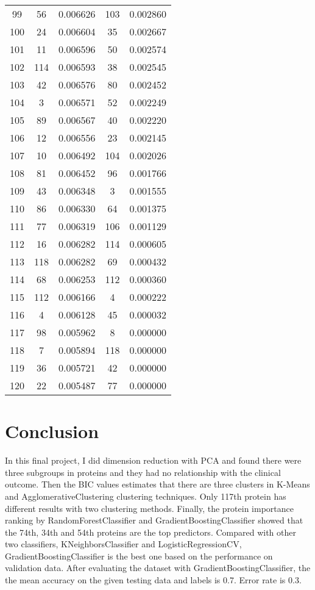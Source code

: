 \documentclass{article}
\begin{document}
\begin{center}
\begin{longtable}{|c|c|c|c|r|}
99 & 56  &0.006626 & 103  & 0.002860 \\ 
100 & 24  &0.006604 & 35  & 0.002667 \\ 
101 & 11  &0.006596 & 50  & 0.002574 \\ 
102 & 114  &0.006593 & 38  & 0.002545 \\ 
103 & 42  &0.006576 & 80  & 0.002452 \\ 
104 & 3  &0.006571 & 52  & 0.002249 \\ 
105 & 89  &0.006567 & 40  & 0.002220 \\
106 & 12  &0.006556 & 23  & 0.002145 \\ 
107 & 10  &0.006492 & 104  & 0.002026 \\ 
108 & 81  &0.006452 & 96  & 0.001766 \\
109 & 43  &0.006348 & 3  & 0.001555 \\ 
110 & 86  &0.006330 & 64  & 0.001375 \\ 
111 & 77  &0.006319 & 106  & 0.001129 \\ 
112 & 16  &0.006282 & 114  & 0.000605 \\
113 & 118  &0.006282 & 69  & 0.000432 \\ 
114 & 68  &0.006253 & 112  & 0.000360 \\
115 & 112  &0.006166 & 4  & 0.000222 \\
116 & 4  &0.006128 & 45  & 0.000032 \\ 
117 & 98  &0.005962 & 8  & 0.000000 \\ 
118 & 7  &0.005894 & 118  & 0.000000 \\
119 & 36  &0.005721 & 42  & 0.000000 \\ 
120 & 22  &0.005487  & 77  & 0.000000 \\ 
\end{longtable}
\end{center}

\section{Conclusion}
In this final project, I did dimension reduction with PCA and found there were three subgroups in proteins and they had no relationship with the clinical outcome. Then the BIC values estimates that there are three clusters in K-Means and AgglomerativeClustering clustering techniques. Only 117th protein has different results with two clustering methods. Finally, the protein importance ranking by RandomForestClassifier and GradientBoostingClassifier showed that the 74th, 34th and 54th proteins are the top predictors. Compared with other two classifiers, KNeighborsClassifier and LogisticRegressionCV, GradientBoostingClassifier is the best one based on the performance on validation data. After evaluating the dataset with GradientBoostingClassifier, the the mean accuracy on the given testing data and labels is 0.7. Error rate is 0.3.
\end{document}
